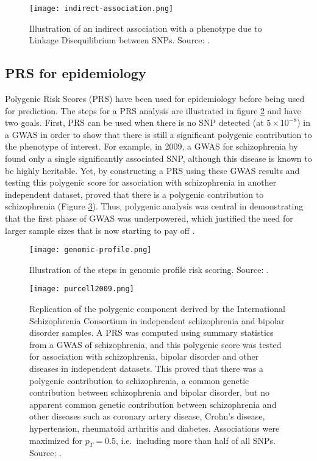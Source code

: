 \begin{figure}[htb]
\centerline{\texttt{[image: indirect-association.png]}}
\caption{Illustration of an indirect association with a phenotype due to Linkage Disequilibrium between SNPs. Source: \cite{astle2009population}.}\label{fig:gwasLD}
\end{figure}

\subsection{PRS for epidemiology}

Polygenic Risk Scores (PRS) have been used for epidemiology before being used for prediction. The steps for a PRS analysis are illustrated in figure \ref{fig:steps-PRS} and have two goals. 
First, PRS can be used when there is no SNP detected (at $5 \times 10^{-8}$) in a GWAS in order to show that there is still a significant polygenic contribution to the phenotype of interest. 
For example, in 2009, a GWAS for schizophrenia by \cite{purcell2009common} found only a single significantly associated SNP, although this disease is known to be highly heritable. Yet, by constructing a PRS using these GWAS results and testing this polygenic score for association with schizophrenia in another independent dataset, \cite{purcell2009common} proved that there is a polygenic contribution to schizophrenia (Figure \ref{fig:epi-PRS}). 
Thus, polygenic analysis was central in demonstrating that the first phase of GWAS was underpowered, which justified the need for larger sample sizes that is now starting to pay off \cite[]{wray2014research}.

\begin{figure}[htb]
\centerline{\texttt{[image: genomic-profile.png]}}
\caption{Illustration of the steps in genomic profile risk scoring. Source: \cite{wray2014research}.}\label{fig:steps-PRS}
\end{figure}

\begin{figure}[htb]
\centerline{\texttt{[image: purcell2009.png]}}
\caption{Replication of the polygenic component derived by the International Schizophrenia Consortium in independent schizophrenia and bipolar disorder samples. A PRS was computed using summary statistics from a GWAS of schizophrenia, and this polygenic score was tested for association with schizophrenia, bipolar disorder and other diseases in independent datasets. This proved that there was a polygenic contribution to schizophrenia, a common genetic contribution between schizophrenia and bipolar disorder, but no apparent common genetic contribution between schizophrenia and other diseases such as coronary artery disease, Crohn's disease, hypertension, rheumatoid arthritis and diabetes. Associations were maximized for $p_T = 0.5$, i.e.\ including more than half of all SNPs. Source: \cite{purcell2009common}.}\label{fig:epi-PRS}
\end{figure}

